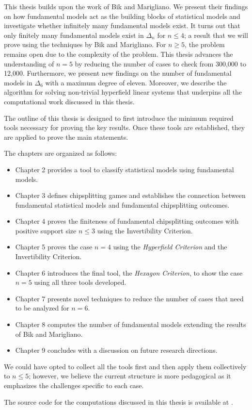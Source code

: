This thesis builds upon the work of Bik and Marigliano. We present their findings on how fundamental models act as the building blocks of statistical models and investigate whether infinitely many fundamental models exist. It turns out that only finitely many fundamental models exist in \( \Delta_n \) for \( n \leq 4 \); a result that we will prove using the techniques by Bik and Marigliano. For \( n \geq 5 \), the problem remains open due to the complexity of the problem. This thesis advances the understanding of \( n = 5 \) by reducing the number of cases to check from 300,000 to 12,000. Furthermore, we present new findings on the number of fundamental models in \( \Delta_6 \) with a maximum degree of eleven. Moreover, we describe the algorithm for solving non-trivial hyperfield linear systems that underpins all the computational work discussed in this thesis. 

The outline of this thesis is designed to first introduce the minimum required tools necessary for proving the key results. Once these tools are established, they are applied to prove the main statements. 

The chapters are organized as follows:
\begin{itemize}
    \item Chapter 2 provides a tool to classify statistical models using fundamental models.
    \item Chapter 3 defines chipsplitting games and establishes the connection between fundamental statistical models and fundamental chipsplitting outcomes.
    \item Chapter 4 proves the finiteness of fundamental chipsplitting outcomes with positive support size \( n \leq 3 \) using the Invertibility Criterion.
    \item Chapter 5 proves the case \( n = 4 \) using the \emph{Hyperfield Criterion} and the Invertibility Criterion.
    \item Chapter 6 introduces the final tool, the \emph{Hexagon Criterion}, to show the case \( n = 5 \) using all three tools developed.
    \item Chapter 7 presents novel techniques to reduce the number of cases that need to be analyzed for \( n = 6 \).
    \item Chapter 8 computes the number of fundamental models extending the results of Bik and Marigliano.
    \item Chapter 9 concludes with a discussion on future research directions.
\end{itemize}


We could have opted to collect all the tools first and then apply them collectively to \( n \leq 5 \); however, we believe the current structure is more pedagogical as it emphasizes the challenges specific to each case.

The source code for the computations discussed in this thesis is available at \cite{ducrepo}.